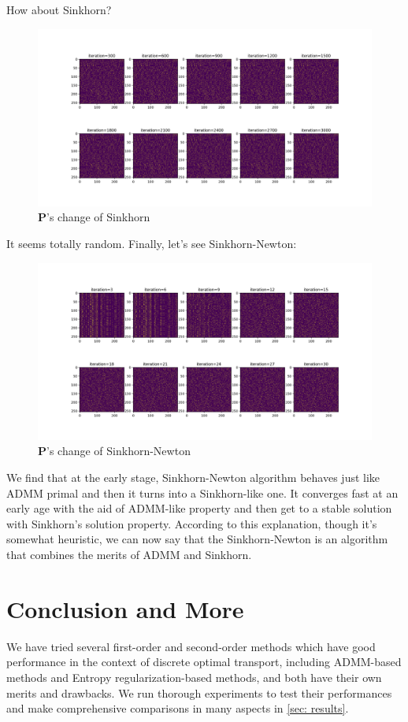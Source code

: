 \documentclass{article}
\begin{document}
\begin{large}
How about Sinkhorn?
\begin{figure}[H] %
   \centering
   \includegraphics[width=5.5in]{pi_sinkhorn_ellip_n16.png} 
   \caption{$\mathbf{P}$'s change of Sinkhorn}
   \label{fig:example}
\end{figure}
It seems totally random. Finally, let's see Sinkhorn-Newton:
\begin{figure}[H] %
   \centering
   \includegraphics[width=5.5in]{pi_sinkhorn_newton_ellip_n16} 
   \caption{$\mathbf{P}$'s change of Sinkhorn-Newton}
   \label{fig:example}
\end{figure}
We find that at the early stage, Sinkhorn-Newton algorithm behaves just like ADMM primal and then it turns into a Sinkhorn-like one. It converges fast at an early age with the aid of ADMM-like property and then get to a stable solution with Sinkhorn's solution property. According to this explanation, though it's somewhat heuristic, we can now say that the Sinkhorn-Newton is an algorithm that combines the merits of ADMM and Sinkhorn.

\section{Conclusion and More}
We have tried several first-order and second-order methods which have good performance in the context of discrete optimal transport, including ADMM-based methods and Entropy regularization-based methods, and both have their own merits and drawbacks. We run thorough experiments to test their performances and make comprehensive comparisons in many aspects in \ref{sec: results}.


\end{large}
\end{document}
